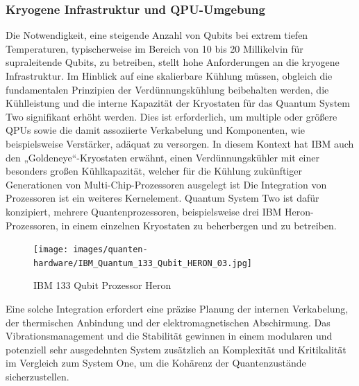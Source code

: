 \subsubsection{Kryogene Infrastruktur und QPU-Umgebung}
Die Notwendigkeit, eine steigende Anzahl von Qubits bei extrem tiefen Temperaturen, typischerweise im Bereich von 10 bis 20 Millikelvin für supraleitende Qubits, zu betreiben, stellt hohe Anforderungen an die kryogene Infrastruktur. Im Hinblick auf eine skalierbare Kühlung müssen, obgleich die fundamentalen Prinzipien der Verdünnungskühlung beibehalten werden, die Kühlleistung und die interne Kapazität der Kryostaten für das Quantum System Two signifikant erhöht werden. 
Dies ist erforderlich, um multiple oder größere QPUs sowie die damit assoziierte Verkabelung und Komponenten, wie beispielsweise Verstärker, adäquat zu versorgen. In diesem Kontext hat IBM auch den „Goldeneye“-Kryostaten erwähnt, einen Verdünnungskühler mit einer besonders großen Kühlkapazität, welcher für die Kühlung zukünftiger Generationen von Multi-Chip-Prozessoren ausgelegt ist %
Die Integration von Prozessoren ist ein weiteres Kernelement. Quantum System Two ist dafür konzipiert, mehrere Quantenprozessoren, beispielsweise drei IBM Heron-Prozessoren, in einem einzelnen Kryostaten zu beherbergen und zu betreiben.

\begin{figure}[H]
    \centering
    \texttt{[image: images/quanten-hardware/IBM\_Quantum\_133\_Qubit\_HERON\_03.jpg]}
    \caption{IBM 133 Qubit Prozessor Heron}
    \label{fig:ibmheron}
\end{figure}
Eine solche Integration erfordert eine präzise Planung der internen Verkabelung, der thermischen Anbindung und der elektromagnetischen Abschirmung. Das Vibrationsmanagement und die Stabilität gewinnen in einem modularen und potenziell sehr ausgedehnten System zusätzlich an Komplexität und Kritikalität im Vergleich zum System One, um die Kohärenz der Quantenzustände sicherzustellen.




